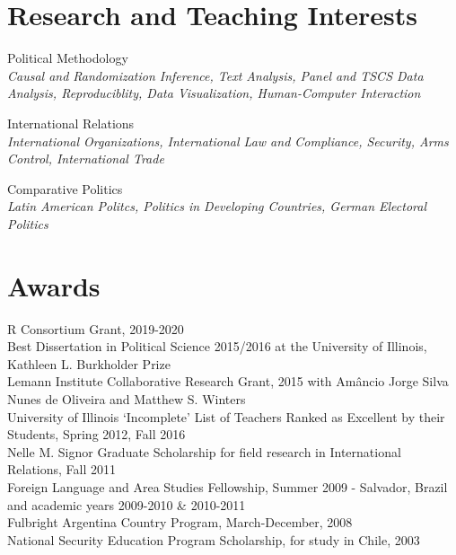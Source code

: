 \documentclass[margin, 10pt]{CVStyleTemplate}\usepackage[]{graphicx}\usepackage[dvipsnames]{xcolor}
\begin{document}
\begin{resume}


\section{Research and Teaching Interests}

Political Methodology\\
\emph{Causal and Randomization Inference, Text Analysis, Panel and TSCS Data Analysis, Reproduciblity, Data Visualization, Human-Computer Interaction}

International Relations\\
\emph{International Organizations, International Law and Compliance, Security, Arms Control, International Trade}

Comparative Politics\\
\emph{Latin American Politcs, Politics in Developing Countries, German Electoral Politics}

\section{Awards}%

R Consortium Grant, 2019-2020\\[6pt]
Best Dissertation in Political Science 2015/2016 at the University of Illinois, Kathleen L. Burkholder Prize  \\[6pt]
Lemann Institute Collaborative Research Grant, 2015 with Am\^{a}ncio Jorge Silva Nunes de Oliveira and Matthew S. Winters\\[6pt]%
University of Illinois `Incomplete' List of Teachers Ranked as Excellent by their Students, Spring 2012, Fall 2016\\[6pt]%
Nelle M. Signor Graduate Scholarship for field research in International Relations, Fall 2011\\[6pt]%
Foreign Language and Area Studies Fellowship, Summer 2009 - Salvador, Brazil and academic years 2009-2010 \& 2010-2011\\[6pt]%
Fulbright Argentina Country Program, March-December, 2008\\[6pt]%
National Security Education Program Scholarship, for study in Chile, 2003\\[6pt]%





\end{resume}
\end{document}
